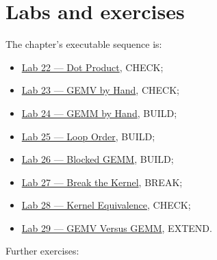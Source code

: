 \section{Labs and exercises}\label{labs-and-exercises}

The chapter's executable sequence is:

\begin{itemize}
\tightlist
\item
  \href{https://github.com/hermonai/inside-the-llm-engine/blob/astra-visual-rewrite/labs/lab-22-dot-product.md}{Lab
  22 --- Dot Product}, CHECK;
\item
  \href{https://github.com/hermonai/inside-the-llm-engine/blob/astra-visual-rewrite/labs/lab-23-gemv-by-hand.md}{Lab
  23 --- GEMV by Hand}, CHECK;
\item
  \href{https://github.com/hermonai/inside-the-llm-engine/blob/astra-visual-rewrite/labs/lab-24-gemm-by-hand.md}{Lab
  24 --- GEMM by Hand}, BUILD;
\item
  \href{https://github.com/hermonai/inside-the-llm-engine/blob/astra-visual-rewrite/labs/lab-25-loop-order.md}{Lab
  25 --- Loop Order}, BUILD;
\item
  \href{https://github.com/hermonai/inside-the-llm-engine/blob/astra-visual-rewrite/labs/lab-26-blocked-gemm.md}{Lab
  26 --- Blocked GEMM}, BUILD;
\item
  \href{https://github.com/hermonai/inside-the-llm-engine/blob/astra-visual-rewrite/labs/lab-27-break-the-kernel.md}{Lab
  27 --- Break the Kernel}, BREAK;
\item
  \href{https://github.com/hermonai/inside-the-llm-engine/blob/astra-visual-rewrite/labs/lab-28-kernel-equivalence.md}{Lab
  28 --- Kernel Equivalence}, CHECK;
\item
  \href{https://github.com/hermonai/inside-the-llm-engine/blob/astra-visual-rewrite/labs/lab-29-gemv-vs-gemm.md}{Lab
  29 --- GEMV Versus GEMM}, EXTEND.
\end{itemize}

Further exercises:

